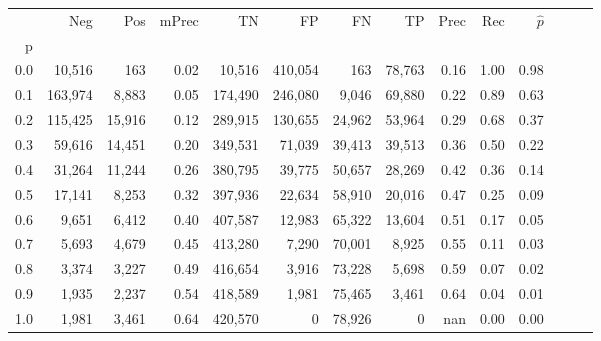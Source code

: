 \begin{tabular}{rrrrrrrrrrrrrr}
\toprule
{} &      Neg &     Pos & mPrec &       TN &       FP &      FN &      TP &  Prec &   Rec & $\hat{p}$ \\
p   &          &         &       &          &          &         &         &       &       &           \\
\midrule
0.0 &   10,516 &     163 &  0.02 &   10,516 &  410,054 &     163 &  78,763 &  0.16 &  1.00 &      0.98 \\
0.1 &  163,974 &   8,883 &  0.05 &  174,490 &  246,080 &   9,046 &  69,880 &  0.22 &  0.89 &      0.63 \\
0.2 &  115,425 &  15,916 &  0.12 &  289,915 &  130,655 &  24,962 &  53,964 &  0.29 &  0.68 &      0.37 \\
0.3 &   59,616 &  14,451 &  0.20 &  349,531 &   71,039 &  39,413 &  39,513 &  0.36 &  0.50 &      0.22 \\
0.4 &   31,264 &  11,244 &  0.26 &  380,795 &   39,775 &  50,657 &  28,269 &  0.42 &  0.36 &      0.14 \\
0.5 &   17,141 &   8,253 &  0.32 &  397,936 &   22,634 &  58,910 &  20,016 &  0.47 &  0.25 &      0.09 \\
0.6 &    9,651 &   6,412 &  0.40 &  407,587 &   12,983 &  65,322 &  13,604 &  0.51 &  0.17 &      0.05 \\
0.7 &    5,693 &   4,679 &  0.45 &  413,280 &    7,290 &  70,001 &   8,925 &  0.55 &  0.11 &      0.03 \\
0.8 &    3,374 &   3,227 &  0.49 &  416,654 &    3,916 &  73,228 &   5,698 &  0.59 &  0.07 &      0.02 \\
0.9 &    1,935 &   2,237 &  0.54 &  418,589 &    1,981 &  75,465 &   3,461 &  0.64 &  0.04 &      0.01 \\
1.0 &    1,981 &   3,461 &  0.64 &  420,570 &        0 &  78,926 &       0 &   nan &  0.00 &      0.00 \\
\bottomrule
\end{tabular}
